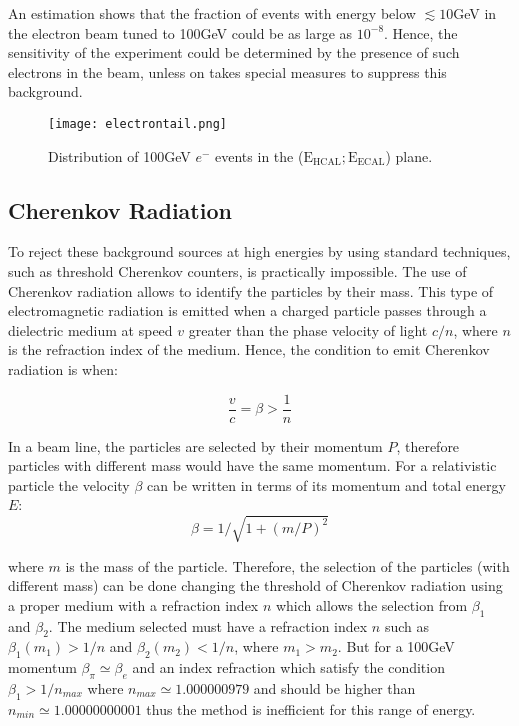 An estimation shows that the fraction of events with energy below $\lesssim 10$GeV in the electron beam tuned to 100GeV
could be as large as $10^{-8}$. Hence, the sensitivity of the experiment could be determined by the presence of such
electrons in the beam, unless on takes special measures to suppress this background. \par


\begin{figure}[ht]
	\hspace*{\fill}
	\centering
	\texttt{[image: electrontail.png]}
	\hspace*{\fill}
	\caption{Distribution of 100GeV $e^-$ events in the ($\mathrm{E_{HCAL};E_{ECAL}}$) plane. }
	\label{fig:electrontail}
\end{figure}



\subsection{Cherenkov Radiation}\label{cerenkov}

To reject these background sources at high energies by using standard techniques, such as threshold Cherenkov counters,
is practically impossible. The use of Cherenkov radiation allows to identify the particles by their mass. This type of
electromagnetic radiation is emitted when a charged particle passes through a dielectric medium at speed $v$ greater
than the phase velocity of light $c/n$, where $n$ is the refraction index of the medium. Hence, the condition to emit
Cherenkov radiation is when:

\begin{equation}\label{condCR}
\frac{v}{c} = \beta > \frac{1}{n} 
\end{equation}

In a beam line, the particles are selected by their momentum $P$, therefore particles with different mass would have the
same momentum. For a relativistic particle the velocity $\beta$ can be written in terms of its momentum and total energy
$E$:
\begin{equation}
\beta=1/\sqrt{1+\left(m/P\right)^2}
\end{equation}

where $m$ is the mass of the particle. Therefore, the selection of the particles (with different mass) can be done
changing the threshold of Cherenkov radiation using a proper medium with a refraction index $n$ which allows the
selection from $\beta_1$ and $\beta_2$. The medium selected must have a refraction index $n$ such as $\beta_1(m_1)>1/n$ and
$\beta_2(m_2)<1/n$, where $m_1>m_2$. But for a 100GeV momentum $\beta_{\pi}\simeq\beta_{e}$ and an index refraction
which satisfy the condition $\beta_1>1/n_{max}$ where $n_{max}\simeq 1.000000979$ and should be higher than $n_{min}\simeq
1.00000000001$  thus the method is inefficient for this range of energy.\par


